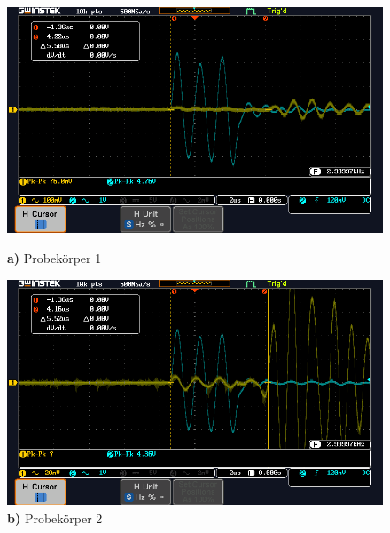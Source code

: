 \begin{figure}
    \begin{minipage}[b]{.50\linewidth} %
       \includegraphics[width=\linewidth]{image/1_Quer.PNG}
       \caption*{\textbf{a)} Probekörper 1}
    \end{minipage}
    \hspace{.01\linewidth}%
    \begin{minipage}[b]{.5\linewidth} %
       \includegraphics[width=\linewidth]{image/2_quer.PNG}
       \caption*{\textbf{b)} Probekörper 2}
    \end{minipage}


\end{figure}

